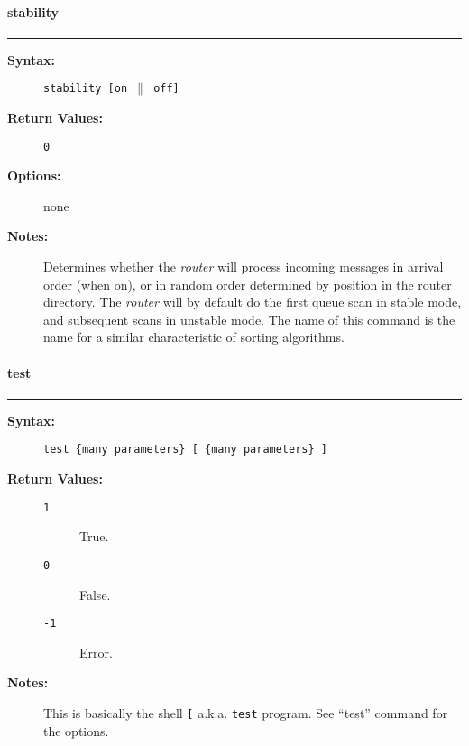 \vspace {2pt}


\paragraph{stability}

\hrule
\begin{description}
\item[{\bf Syntax:}] \mbox{}

{\tt stability [on $\|$ off]}

\item[{\bf Return Values:}] \mbox{}

\begin{description}
\item[{\tt 0}] \mbox{}



\end{description}


\item[{\bf Options:}] \mbox{}

none  

\item[{\bf Notes:}] \mbox{}

Determines whether the {\em router\/} will 
process incoming messages in arrival order (when on), or in random 
order determined by position in the router directory. The {\em router\/} 
will by default do the first queue scan in stable mode, and subsequent 
scans in unstable mode. The name of this command is the name for a 
similar characteristic of sorting algorithms. 

\end{description}


\vspace {2pt}


\paragraph{test}

\hrule
\begin{description}
\item[{\bf Syntax:}] \mbox{}

{\tt test \{many parameters\} [ \{many parameters\} ]}

\item[{\bf Return Values:}] \mbox{}

\begin{description}
\item[{\tt 1}] \mbox{}

True.

\item[{\tt 0}] \mbox{}

False.

\item[{\tt -1}] \mbox{}

Error.

\end{description}


\item[{\bf Notes:}] \mbox{}

This is basically the shell {\tt [} a.k.a. 
{\tt test} program. See ``test'' command for the options.

\end{description}


